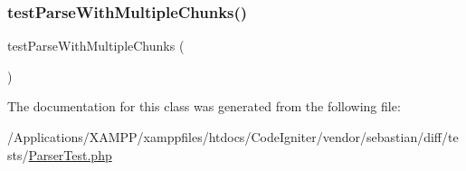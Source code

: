 \subsubsection{\texorpdfstring{test\+Parse\+With\+Multiple\+Chunks()}{testParseWithMultipleChunks()}}
{\footnotesize\ttfamily test\+Parse\+With\+Multiple\+Chunks (\begin{DoxyParamCaption}{ }\end{DoxyParamCaption})}



The documentation for this class was generated from the following file\+:\begin{DoxyCompactItemize}
\item 
/\+Applications/\+X\+A\+M\+P\+P/xamppfiles/htdocs/\+Code\+Igniter/vendor/sebastian/diff/tests/\mbox{\hyperlink{sebastian_2diff_2tests_2_parser_test_8php}{Parser\+Test.\+php}}\end{DoxyCompactItemize}
